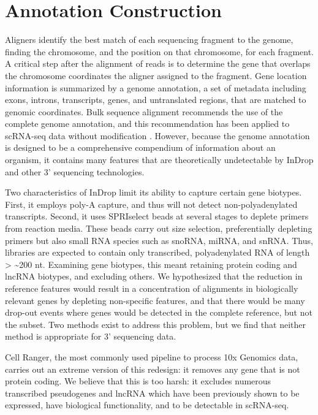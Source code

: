 \section{Annotation Construction}

Aligners identify the best match of each sequencing fragment to the genome, finding the chromosome, and the position on that chromosome, for each fragment. 
A critical step after the alignment of reads is to determine the gene that overlaps the chromosome coordinates the aligner assigned to the fragment. 
Gene location information is summarized by a genome annotation, a set of metadata including exons, introns, transcripts, genes, and untranslated regions, that are matched to genomic coordinates. 
Bulk sequence alignment recommends the use of the complete genome annotation, and this recommendation has been applied to scRNA-seq data without modification \citep{Shalek2014,Jaitin2014,Klein2015,Macosko2015}. 
However, because the genome annotation is designed to be a comprehensive compendium of information about an organism, it contains many features that are theoretically undetectable by InDrop and other 3' sequencing technologies.

Two characteristics of InDrop limit its ability to capture certain gene biotypes. 
First, it employs poly-A capture, and thus will not detect non-polyadenylated transcripts. Second, it uses SPRIselect beads at several stages to deplete primers from reaction media. 
These beads carry out size selection, preferentially depleting primers but also small RNA species such as snoRNA, miRNA, and snRNA\@. Thus, libraries are expected to contain only transcribed, polyadenylated RNA of length \textgreater{} \textasciitilde{}200 nt. 
Examining gene biotypes, this meant retaining protein coding and lncRNA biotypes, and excluding others.
We hypothesized that the reduction in reference features would result in a concentration of alignments in biologically relevant genes by depleting non-specific features, and that there would be many drop-out events where genes would be detected in the complete reference, but not the subset.
Two methods exist to address this problem, but we find that neither method is appropriate for 3' sequencing data. 

Cell Ranger, the most commonly used pipeline to process 10x Genomics data, carries out an extreme version of this redesign: it removes any gene that is not protein coding. 
We believe that this is too harsh: it excludes numerous transcribed pseudogenes and lncRNA which have been previously shown to be expressed, have biological functionality, and to be detectable in scRNA-seq.

